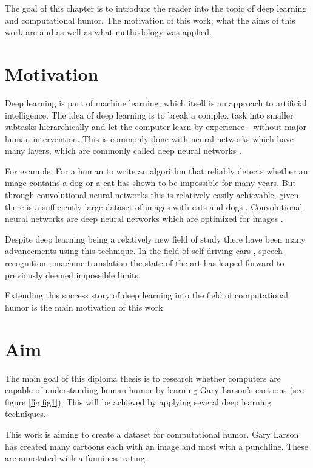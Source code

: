\documentclass[draft,final,oneside]{vutinfth} %
\begin{document}
The goal of this chapter is to introduce the reader into the topic of deep learning and computational humor. The motivation of this work, what the aims of this work are and as well as what methodology was applied.

\section{Motivation}

Deep learning is part of machine learning, which itself is an approach to artificial intelligence. The idea of deep learning	is to break a complex task into smaller subtasks hierarchically and let the computer learn by experience - without major human intervention. This is commonly done with neural networks which have many layers, which are commonly called deep neural networks \cite{Goodfellow-et-al-2016}.

For example: For a human to write an algorithm that reliably detects whether an image contains a dog or a cat has shown to be impossible for many years. But through convolutional neural networks this is relatively easily achievable, given there is a sufficiently large dataset of images with cats and dogs \cite{dogsvscats}. Convolutional neural networks are deep neural networks which are optimized for images \cite{cnnimg}.

Despite deep learning being a relatively new field of study there have been many advancements using this technique. In the field of self-driving cars \cite{selfdriving}, speech recognition \cite{speech}, machine translation \cite{nmt} the state-of-the-art has leaped forward to previously deemed impossible limits.

Extending this success story of deep learning into the field of computational humor is the main motivation of this work.

\section{Aim} \label{aim}
The main goal of this diploma thesis is to research whether computers are capable of understanding human humor by learning Gary Larson's cartoons (see figure \ref{fig:fig1}). This will be achieved by applying several deep learning techniques.

This work is aiming to create a dataset for computational humor. Gary Larson has created many cartoons each with an image and most with a punchline. These are annotated with a funniness rating.
\end{document}
